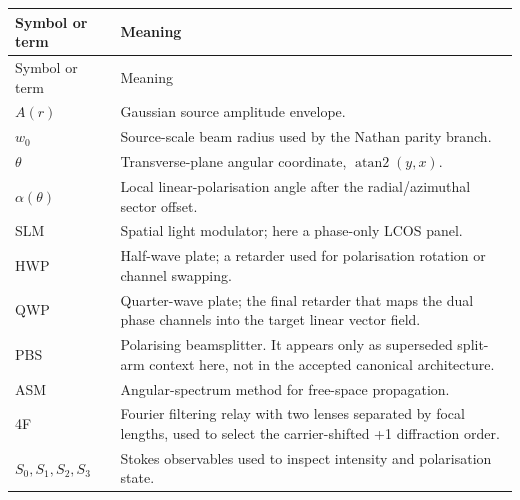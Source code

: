 \documentclass[11pt,a4paper]{report}
\begin{document}
\begin{longtable}{p{}p{}}

\toprule

Symbol or term & Meaning\\

\midrule

\endfirsthead

\toprule

Symbol or term & Meaning\\

\midrule

\endhead

\(A(r)\) & Gaussian source amplitude envelope.\\

\(w_0\) & Source-scale beam radius used by the Nathan parity branch.\\

\(\theta\) & Transverse-plane angular coordinate, \(\operatorname{atan2}(y,x)\).\\

\(\alpha(\theta)\) & Local linear-polarisation angle after the radial/azimuthal sector offset.\\

SLM & Spatial light modulator; here a phase-only LCOS panel.\\

HWP & Half-wave plate; a retarder used for polarisation rotation or channel swapping.\\

QWP & Quarter-wave plate; the final retarder that maps the dual phase channels into the target linear vector field.\\

PBS & Polarising beamsplitter. It appears only as superseded split-arm context here, not in the accepted canonical architecture.\\

ASM & Angular-spectrum method for free-space propagation.\\

4F & Fourier filtering relay with two lenses separated by focal lengths, used to select the carrier-shifted +1 diffraction order.\\

\(S_0,S_1,S_2,S_3\) & Stokes observables used to inspect intensity and polarisation state.\\

\bottomrule

\end{longtable}
\end{document}

